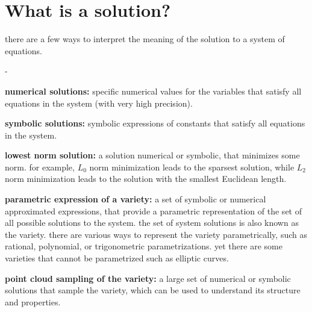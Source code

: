 \section*{What is a solution?}
there are a few ways to interpret the meaning of the solution to a system of equations.
\begin{list}{-}{}
    \item \textbf{numerical solutions:} specific numerical values for the variables that satisfy all equations in the system (with very high precision).
    \item \textbf{symbolic solutions:} symbolic expressions of constants that satisfy all equations in the system.
    \item \textbf{lowest norm solution:} a solution numerical or symbolic, that minimizes some norm. for example, $L_0$ norm minimization leads to the sparsest solution, while $L_2$ norm minimization leads to the solution with the smallest Euclidean length.
    \item \textbf{parametric expression of a variety:} a set of symbolic or numerical approximated expressions, that provide a parametric representation of the set of all possible solutions to the system. the set of system solutions is also known as the variety. there are various ways to represent the variety parametrically, such as rational, polynomial, or trigonometric parametrizations. yet there are some varieties that cannot be parametrized such as elliptic curves.
    \item \textbf{point cloud sampling of the variety:} a large set of numerical or symbolic solutions that sample the variety, which can be used to understand its structure and properties.
\end{list}

